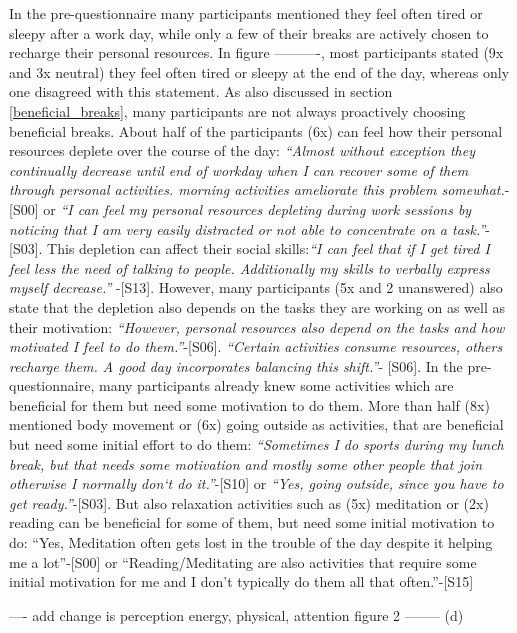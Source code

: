 \documentclass{hasel_thesis}
\begin{document}
In the pre-questionnaire many participants mentioned they feel often tired or sleepy after a work day, while only a few of their breaks are actively chosen to recharge their personal resources. In figure ----------, most participants stated (9x and 3x neutral) they feel often tired or sleepy at the end of the day, whereas only one disagreed with this statement. As also discussed in section \ref{beneficial_breaks}, many participants are not always proactively choosing beneficial breaks. About half of the participants (6x) can feel how their personal resources deplete over the course of the day: \textit{“Almost without exception they continually decrease until end of workday when I can recover some of them through personal activities. morning activities ameliorate this problem somewhat.}-[S00] or \textit{“I can feel my personal resources depleting during work sessions by noticing that I am very easily distracted or not able to concentrate on a task.”}-[S03]. This depletion can affect their social skills:\textit{“I can feel that if I get tired I feel less the need of talking to people. Additionally my skills to verbally express myself decrease.” } -[S13]. However, many participants (5x and 2 unanswered) also state that the depletion also depends on the tasks they are working on as well as their motivation: \textit{“However, personal resources also depend on the tasks and how motivated I feel to do them.”}-[S06]. \textit{“Certain activities consume resources, others recharge them. A good day incorporates balancing this shift.”}- [S06]. In the pre-questionnaire, many participants already knew some activities which are beneficial for them but need some motivation to do them. More than half (8x) mentioned body movement or (6x) going outside as activities, that are beneficial but need some initial effort to do them: \textit{“Sometimes I do sports during my lunch break, but that needs some motivation and mostly some other people that join otherwise I normally don‘t do it.”}-[S10] or \textit{“Yes, going outside, since you have to get ready.”}-[S03]. But also relaxation activities such as (5x) meditation or (2x) reading can be beneficial for some of them, but need some initial motivation to do: “Yes, Meditation often gets lost in the trouble of the day despite it helping me a lot”-[S00] or “Reading/Meditating are also activities that require some initial motivation for me and I don't typically do them all that often.”-[S15]

---- add change is perception energy, physical, attention figure 2 -------- (d)
\end{document}
